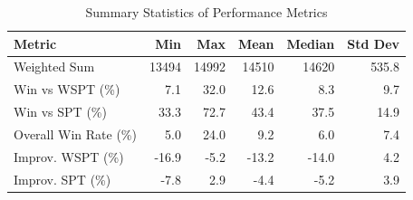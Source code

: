 \begin{table}[htbp]%
\centering%
\begin{tabular}{lrrrrr}%
\toprule%
\textbf{Metric}&\textbf{Min}&\textbf{Max}&\textbf{Mean}&\textbf{Median}&\textbf{Std Dev}\\%
\midrule%
Weighted Sum&13494&14992&14510&14620&535.8\\%
Win vs WSPT (\%)&7.1&32.0&12.6&8.3&9.7\\%
Win vs SPT (\%)&33.3&72.7&43.4&37.5&14.9\\%
Overall Win Rate (\%)&5.0&24.0&9.2&6.0&7.4\\%
Improv. WSPT (\%)&-16.9&-5.2&-13.2&-14.0&4.2\\%
Improv. SPT (\%)&-7.8&2.9&-4.4&-5.2&3.9\\%
\bottomrule%
\end{tabular}%
\caption{Summary Statistics of Performance Metrics}%
\label{tab:metrics}%
\end{table}
